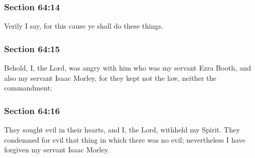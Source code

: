 	\subsubsection{Section 64:14} %
		\label{DC64-14}

		Verily I say, for this cause ye shall do these things.


	\subsubsection{Section 64:15} %
		\label{DC64-15}

		Behold, I, the Lord, was angry with him who was my servant Ezra Booth, and also my servant Isaac Morley, for they kept not the law, neither the commandment;


	\subsubsection{Section 64:16} %
		\label{DC64-16}

		 They sought evil in their hearts, and I, the Lord, withheld my Spirit.  They condemned for evil that thing in which there was no evil; nevertheless I have forgiven my servant Isaac Morley.


